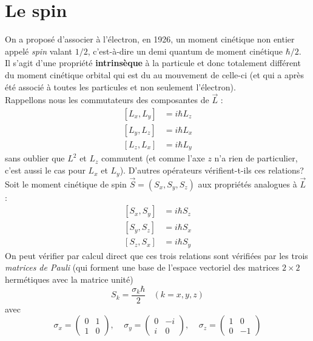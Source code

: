 \documentclass	[11pt, a4paper, openany]{book}
\begin{document}
	\section{Le spin}
	On a proposé d'associer à l'électron, en 1926, un moment cinétique non entier appelé
	\textit{spin} valant $1/2$, c'est-à-dire un demi quantum de moment cinétique $\hbar/
	2$.\\
	Il s'agit d'une propriété \textbf{intrinsèque} à la particule et donc totalement 
	différent du moment cinétique orbital qui est du au mouvement de celle-ci (et qui 
	a après été associé à toutes les particules et non seulement l'électron).\\
	Rappellons nous les commutateurs des composantes de $\vec{L}$ :
	\begin{equation}
	\begin{array}{ll}
	[L_x,L_y] &= i\hbar L_z\\
	\left[L_y,L_z\right] &= i\hbar L_x\\
	\left[L_z,L_x\right] &= i\hbar L_y
	\end{array}
	\end{equation}
	sans oublier que $L^2$ et $L_z$ commutent (et comme l'axe $z$ n'a rien de particulier,
	c'est aussi le cas pour $L_x$ et $L_y$). D'autres opérateurs vérifient-t-ils ces 
	relations? \\
	Soit le moment cinétique de spin $\vec{S} = (S_x,S_y,S_z)$ aux propriétés analogues
	à $\vec{L}$ :
	\begin{equation}
	\begin{array}{cc}
	[S_x,S_y] &= i\hbar S_z\\
	\left[S_y,S_z\right] &= i\hbar S_x\\
	\left[S_z,S_x\right] &= i\hbar S_y
	\end{array}
	\end{equation}
	On peut vérifier par calcul direct que ces trois relations sont vérifiées par les 
	trois \textit{matrices de Pauli} (qui forment une base de l'espace vectoriel des 
	matrices $2\times2$ hermétiques avec la matrice unité)
	\begin{equation}
	S_k = \frac{\sigma_k \hbar}{2}\ \ \ \ (k=x,y,z)
	\end{equation}
	avec
	\begin{equation}
	\sigma_x = \left(\begin{array}{cc}
	0 & 1\\
	1 & 0
	\end{array}\right),\ \ \ \ \ \sigma_y =	\left(\begin{array}{cc}
	0 & -i\\
	i & 0
	\end{array}\right),\ \ \ \ \ \sigma_z =	\left(\begin{array}{cc}
	1 & 0\\
	0 & -1
	\end{array}\right)
	\end{equation}
\end{document}
